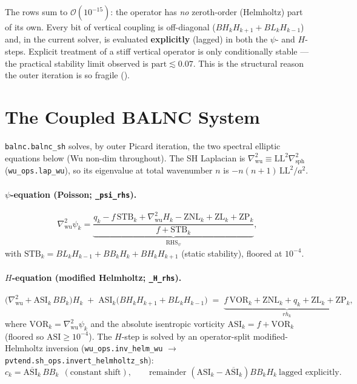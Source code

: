 \begin{keybox}
The rows sum to $\mathcal{O}(10^{-15})$: the operator has \emph{no}
zeroth-order (Helmholtz) part of its own.  Every bit of vertical
coupling is off-diagonal ($BH_k H_{k+1}+BL_k H_{k-1}$) and, in the
current solver, is evaluated \textbf{explicitly} (lagged) in both the
$\psi$- and $H$-steps.  Explicit treatment of a stiff vertical operator
is only conditionally stable --- the practical stability limit observed
is $\mathrm{part}\lesssim 0.07$.  This is the structural reason the
outer iteration is so fragile ().
\end{keybox}

\section{The Coupled BALNC System}
\label{sec:wu_balnc_eqs}

\texttt{balnc.balnc\_sh} solves, by outer Picard iteration, the two
spectral elliptic equations below (Wu non-dim throughout).  The SH
Laplacian is $\nabla^2_{\text{wu}}\equiv\mathrm{LL}^2\nabla^2_{\text{sph}}$
(\texttt{wu\_ops.lap\_wu}), so its eigenvalue at total wavenumber $n$ is
$-n(n{+}1)\,\mathrm{LL}^2/a^2$.

\paragraph{$\psi$-equation (Poisson; \texttt{\_psi\_rhs}).}
\begin{equation}
\nabla^2_{\text{wu}}\psi_k
   = \underbrace{\frac{q_k - f\,\mathrm{STB}_k + \nabla^2_{\text{wu}}H_k
        - \mathrm{ZNL}_k + \mathrm{ZL}_k + \mathrm{ZP}_k}{f+\mathrm{STB}_k}}_{\text{RHS}_\psi},
\label{eq:wu_psi}
\end{equation}
with $\mathrm{STB}_k=BL_kH_{k-1}+BB_kH_k+BH_kH_{k+1}$ (static stability),
floored at $10^{-4}$.

\paragraph{$H$-equation (modified Helmholtz; \texttt{\_H\_rhs}).}
\begin{equation}
\bigl(\nabla^2_{\text{wu}} + \mathrm{ASI}_k\,BB_k\bigr)H_k
  \;+\;\mathrm{ASI}_k\bigl(BH_kH_{k+1}+BL_kH_{k-1}\bigr)
  \;=\;\underbrace{f\,\mathrm{VOR}_k+\mathrm{ZNL}_k+q_k+\mathrm{ZL}_k+\mathrm{ZP}_k}_{rh_k},
\label{eq:wu_H}
\end{equation}
where $\mathrm{VOR}_k=\nabla^2_{\text{wu}}\psi_k$ and the absolute
isentropic vorticity $\mathrm{ASI}_k=f+\mathrm{VOR}_k$ (floored so
$\mathrm{ASI}\ge 10^{-4}$).  The $H$-step is solved by an
operator-split modified-Helmholtz inversion (\texttt{wu\_ops.inv\_helm\_wu}
$\to$ \texttt{pvtend.sh\_ops.invert\_helmholtz\_sh}):
\begin{equation}
c_k=\overline{\mathrm{ASI}_k}\,BB_k\ \ (\text{constant shift}),\qquad
\text{remainder }(\mathrm{ASI}_k-\overline{\mathrm{ASI}_k})BB_kH_k\ \text{lagged explicitly.}
\end{equation}

